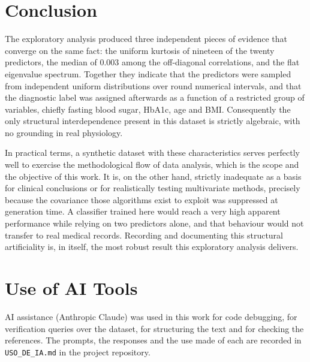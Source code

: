 \documentclass[conference]{IEEEtran}
\begin{document}
\section{Conclusion}
\label{sec:conclusion}

The exploratory analysis produced three independent pieces of evidence
that converge on the same fact: the uniform kurtosis of nineteen of
the twenty predictors, the median of $0.003$ among the off-diagonal
correlations, and the flat eigenvalue spectrum. Together they indicate
that the predictors were sampled from independent uniform
distributions over round numerical intervals, and that the diagnostic
label was assigned afterwards as a function of a restricted group of
variables, chiefly fasting blood sugar, HbA1c, age and BMI.
Consequently the only structural interdependence present in this
dataset is strictly algebraic, with no grounding in real physiology.

In practical terms, a synthetic dataset with these characteristics
serves perfectly well to exercise the methodological flow of data
analysis, which is the scope and the objective of this work. It is,
on the other hand, strictly inadequate as a basis for clinical
conclusions or for realistically testing multivariate methods,
precisely because the covariance those algorithms exist to exploit was
suppressed at generation time. A classifier trained here would reach a
very high apparent performance while relying on two predictors alone,
and that behaviour would not transfer to real medical records.
Recording and documenting this structural artificiality is, in itself,
the most robust result this exploratory analysis delivers.

\section*{Use of AI Tools}
AI assistance (Anthropic Claude) was used in this work for code
debugging, for verification queries over the dataset, for structuring
the text and for checking the references. The prompts, the responses
and the use made of each are recorded in \texttt{USO\_DE\_IA.md} in
the project repository.



\end{document}
